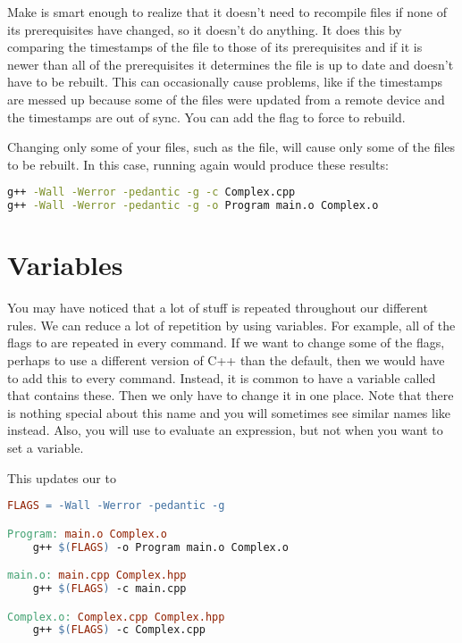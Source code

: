 Make is smart enough to realize that it doesn't need to recompile files if none of its prerequisites have changed, so it doesn't do anything.
It does this by comparing the timestamps of the file to those of its prerequisites and if it is newer than all of the prerequisites it determines the file is up to date and doesn't have to be rebuilt.
This can occasionally cause problems, like if the timestamps are messed up because some of the files were updated from a remote device and the timestamps are out of sync.
You can add the  flag to force  to rebuild.

Changing only some of your files, such as the  file, will cause only some of the files to be rebuilt.
In this case, running  again would produce these results:
\begin{lstlisting}[language=bash]
g++ -Wall -Werror -pedantic -g -c Complex.cpp
g++ -Wall -Werror -pedantic -g -o Program main.o Complex.o
\end{lstlisting}


\section{Variables}\label{sec:makefile-variables}

You may have noticed that a lot of stuff is repeated throughout our different rules.
We can reduce a lot of repetition by using variables.
For example, all of the flags to  are repeated in every command.
If we want to change some of the flags, perhaps to use a different version of C++ than the default, then we would have to add this to every command.
Instead, it is common to have a variable called  that contains these.
Then we only have to change it in one place.
Note that there is nothing special about this name and you will sometimes see similar names like  instead.
Also, you will use \code{\$} to evaluate an expression, but not when you want to set a variable.

This updates our  to
\begin{lstlisting}[language=make]
FLAGS = -Wall -Werror -pedantic -g

Program: main.o Complex.o
	g++ $(FLAGS) -o Program main.o Complex.o

main.o: main.cpp Complex.hpp
	g++ $(FLAGS) -c main.cpp

Complex.o: Complex.cpp Complex.hpp
	g++ $(FLAGS) -c Complex.cpp
\end{lstlisting}

